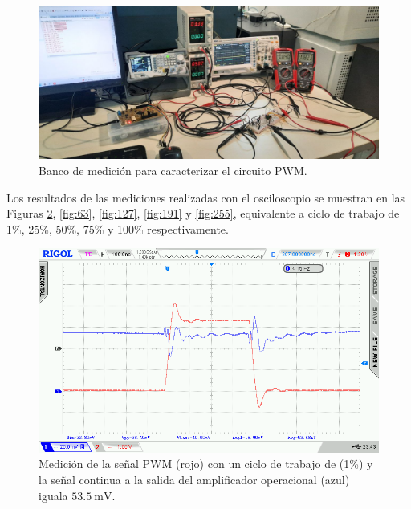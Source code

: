 \begin{figure}[H]
    \centering
    \includegraphics[width=1.1\linewidth]{Figuras/datalogger/Hardware/BancoMedicion1.jpg}
    \caption{Banco de medición para caracterizar el circuito PWM.}
    \label{fig:BancoMedicion1}
\end{figure}

Los resultados de las mediciones realizadas con el osciloscopio se muestran en las Figuras \ref{fig:1}, \ref{fig:63}, \ref{fig:127}, \ref{fig:191} y \ref{fig:255}, equivalente a ciclo de trabajo de 1\%, 25\%, 50\%, 75\% y 100\% respectivamente.



\begin{figure}[H]
    \centering
    \includegraphics[width=0.9\linewidth]{Figuras/datalogger/Hardware/MedicionesPWM/1.png}
    \caption{Medición de la señal PWM (rojo) con un ciclo de trabajo de (1\%) y la señal continua a la salida del amplificador operacional (azul) iguala $\SI{53.5}{\milli\volt}$.}
    \label{fig:1}
\end{figure}


